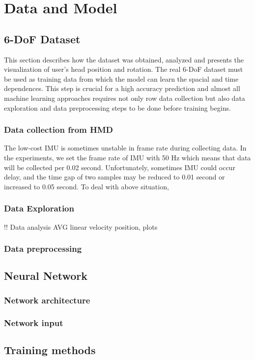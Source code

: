 \chapter{Data and Model}
\label{sec:design}

\section{6-DoF Dataset}
\label{sec:design:dataset}
This section describes how the dataset was obtained, analyzed and presents the visualization of user's head position and rotation. The real 6-DoF dataset must be used as training data from which the model can learn the spacial and time dependences. This step is crucial for a high accuracy prediction and almost all machine learning approaches requires not only row data collection but also data exploration and data preprocessing steps to be done before training begins.

\subsection{Data collection from HMD}
\label{sec:design:dataset:HL}
The low-cost IMU is sometimes unstable in frame rate during collecting data. In the experiments, we set the frame rate of IMU with 50 Hz which means that data will be collected per 0.02 second. Unfortunately, sometimes IMU could occur delay, and the time gap of two samples may be reduced to 0.01 second or increased to 0.05 second. To deal with above situation,

\subsection{Data Exploration}
\label{sec:design:dataset:explor}
!! Data analysis AVG linear velocity position, plots 

\subsection{Data preprocessing}
\label{sec:design:dataset:preprocessing}


\section{Neural Network}
\label{sec:design:nn}

\subsection{Network architecture}
\label{sec:design:nn:architecture}

\subsection{Network input}
\label{sec:design:nn:input}


\section{Training methods}
\label{sec:design:train}
